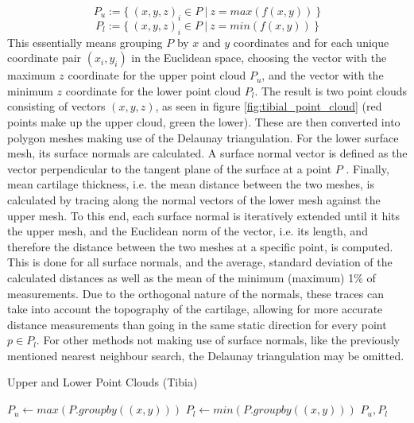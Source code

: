 \newline
\begin{equation}
	P_{u} := \{\:(x,y,z)_i \in P \:|\: z = max(f(x,y))\:\}
\end{equation}
\begin{equation}
	P_{l} := \{\:(x,y,z)_i \in P \:|\: z = min(f(x,y))\:\}
\end{equation}
\newline
This essentially means grouping $P$ by $x$ and $y$ coordinates and for each unique coordinate pair $(x_i, y_i)$ in the Euclidean space, choosing the vector with the maximum $z$ coordinate for the upper point cloud $P_{u}$, and the vector with the minimum $z$ coordinate for the lower point cloud $P_{l}$. The result is two point clouds consisting of vectors $(x, y, z)$, as seen in figure \ref{fig:tibial_point_cloud} (red points make up the upper cloud, green the lower). These are then converted into polygon meshes making use of the Delaunay triangulation. For the lower surface mesh, its surface normals are calculated. A surface normal vector is defined as the vector perpendicular to the tangent plane of the surface at a point $P$ \cite{enwiki:normal}. Finally, mean cartilage thickness, i.e. the mean distance between the two meshes, is calculated by tracing along the normal vectors of the lower mesh against the upper mesh. To this end, each surface normal is iteratively extended until it hits the upper mesh, and the Euclidean norm of the vector, i.e. its length, and therefore the distance between the two meshes at a specific point, is computed. This is done for all surface normals, and the average, standard deviation of the calculated distances as well as the mean of the minimum (maximum) 1\% of measurements. Due to the orthogonal nature of the normals, these traces can take into account the topography of the cartilage, allowing for more accurate distance measurements than going in the same static direction for every point $p \in P_{l}$. For other methods not making use of surface normals, like the previously mentioned nearest neighbour search, the Delaunay triangulation may be omitted.
\begin{algorithm}
	\caption{Upper and Lower Point Clouds (Tibia)}
	\label{algo:tibialpointclouds}
	\begin{algorithmic}[1]
		\State $P_{u} \gets max(P.groupby((x,y)))$
		\State $P_{l} \gets min(P.groupby((x,y)))$
		\State
		\Return $P_{u}, P_{l}$
		\EndProcedure
	\end{algorithmic}
\end{algorithm} 
